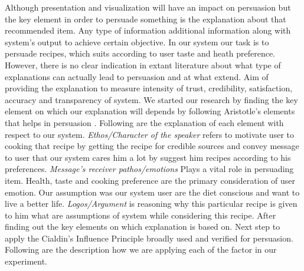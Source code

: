 Although presentation and visualization will have an impact on persuasion but the key element in order to persuade something is the explanation about that recommended item. Any type of information additional information along with system’s output to achieve certain objective.  In our system our task is to persuade recipes, which suits according to user taste and heath preference. However, there is no clear indication in extant literature about what type of explanations can actually lead to persuasion and at what extend. Aim of providing the explanation to measure intensity of trust, credibility, satisfaction, accuracy and transparency of system. We started our research by finding the key element on which our explanation will depends by following Aristotle’s elements that helps in persuasion \cite{gkika2014persuasive}. Following are the explanation of each element with respect to our system. \textit{Ethos/Character of the speaker} refers to motivate user to cooking that recipe by getting the recipe for credible sources and convey message to user that our system cares him a lot by suggest him recipes according to his preferences. \textit{Message’s receiver pathos/emotions} Plays a vital role in persuading item. Health, taste and cooking preference are the primary consideration of user emotion. Our assumption was our system user are the diet conscious and want to live a better life. \textit{Logos/Argument} is reasoning why this particular recipe is given to him what are assumptions of system while considering this recipe. After finding out the key elements on which explanation is based on. Next step to apply the Cialdin’s Influence Principle\cite{cialdini2009influence} broadly used and verified for persuasion. Following are the description how we are applying each of the factor in our experiment.
  
